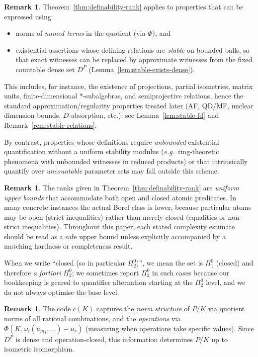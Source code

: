\documentclass[12pt,fleqn,a4paper]{amsart}
\numberwithin{equation}{section}
\theoremstyle{definition}
\newtheorem{remark}[theorem]{Remark}
\begin{document}
\begin{remark}\label{rem:dense-method-scope}
Theorem~\ref{thm:definability-rank} applies to properties that can be expressed using:
\begin{itemize}
\item norms of \emph{named terms} in the quotient (via $\Phi$), and
\item existential assertions whose defining relations are \emph{stable} on bounded balls,
so that exact witnesses can be replaced by approximate witnesses from the fixed
countable dense set $D^P$ (Lemma~\ref{lem:stable-exists-dense}).
\end{itemize}
This includes, for instance, the existence of projections, partial isometries,
matrix units, finite-dimensional $*$-subalgebras, and semiprojective relations, hence
the standard approximation/regularity properties treated later (AF, QD/MF, nuclear
dimension bounds, $D$-absorption, etc.); see Lemma~\ref{lem:stable-fd} and
Remark~\ref{rem:stable-relations}.

By contrast, properties whose definitions require \emph{unbounded} existential
quantification without a uniform stability modulus (\emph{e.g.}\ ring-theoretic phenomena
with unbounded witnesses in reduced products) or that intrinsically quantify over
\emph{uncountable} parameter sets may fall outside this scheme.
\end{remark}

\begin{remark}\label{rem:upper-bounds}
The ranks given in Theorem~\ref{thm:definability-rank} are \emph{uniform upper bounds}
that accommodate both open and closed atomic predicates.  In many concrete instances
the actual Borel class is lower, because particular atoms may be open (strict
inequalities) rather than merely closed (equalities or non-strict inequalities).
Throughout this paper, each stated complexity estimate should be read as a safe upper
bound unless explicitly accompanied by a matching hardness or completeness result.

When we write ``closed (so in particular $\Pi^0_2$)'', we mean the set is $\Pi^0_1$ (closed) and
therefore \emph{a fortiori} $\Pi^0_2$; we sometimes report $\Pi^0_2$ in
such cases because our bookkeeping is geared to quantifier alternation
starting at the $\Pi^0_2$ level, and we do not always optimise the base level.
\end{remark}

\begin{remark}\label{rem:encoding}
The code $c(K)$ captures the \emph{norm structure} of $P/K$ via quotient norms of
all rational combinations, and the \emph{operations} via
$\Phi(K,\omega_i(u_{m_1},\ldots)-u_r)$ (measuring when operations take specific values).
Since $D^P$ is dense and operation-closed, this information determines $P/K$ up to
isometric isomorphism.
\end{remark}
\end{document}
